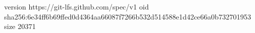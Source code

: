 version https://git-lfs.github.com/spec/v1
oid sha256:6e34ff6b69ffed0d4364aa66087f7266b532d514588e1d42ce66a0b732701953
size 20371
